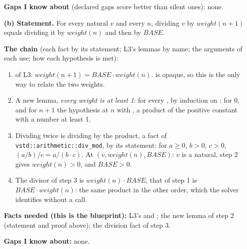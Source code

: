 \documentclass[11pt]{article}
\begin{document}
\begin{answer}
\textbf{Gaps I know about} (declared gaps score better than silent ones):
none.

\textbf{(b) Statement.} For every natural $v$ and every $n$, dividing $v$ by
$\mathit{weight}(n + 1)$ equals dividing it by $\mathit{weight}(n)$ and then
by $\mathit{BASE}$.

\textbf{The chain} (each fact by its statement; L3's lemmas by name; the
arguments of each use; how each hypothesis is met):
\begin{enumerate}
\item {} of L3: $\mathit{weight}(n + 1) =
  \mathit{BASE} \cdot \mathit{weight}(n)$.  is opaque, so this is
  the only way to relate the two weights.
\item A new lemma, \emph{every weight is at least 1}:  for
  every , by induction on :  for 0, and
  for $n + 1$ the hypothesis at $n$ with , a product
  of the positive constant  with a number at least 1.
\item Dividing twice is dividing by the product, a fact of
  \texttt{vstd::arithmetic::div\_mod}, by its statement: for $a \geq 0$,
  $b > 0$, $c > 0$, $(a / b) / c = a / (b \cdot c)$. At
  $(v, \mathit{weight}(n), \mathit{BASE})$: $v$ is a natural, step 2 gives
  $\mathit{weight}(n) > 0$, and $\mathit{BASE} > 0$.
\item The divisor of step 3 is $\mathit{weight}(n) \cdot \mathit{BASE}$, that
  of step 1 is $\mathit{BASE} \cdot \mathit{weight}(n)$: the same product in
  the other order, which the solver identifies without a call.
\end{enumerate}

\textbf{Facts needed (this is the blueprint):} L3's 
and ; the new lemma of step 2 (statement and proof
above); the division fact of step 3.

\textbf{Gaps I know about:} none.
\end{answer}

\end{document}
